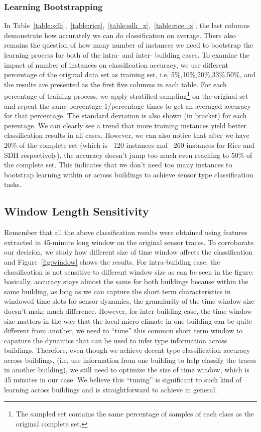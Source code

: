 \subsubsection{Learning Bootstrapping}
In Table~\ref{table:sdh},~\ref{table:rice},~\ref{table:sdh_x},~\ref{table:rice_x}, the last columns demonstrate how accurately we can do classification on average. There also remains the question of how many number of instances we need to bootstrap the learning process for both of the intra- and inter- building cases. To examine the impact of number of instances on classification accuracy, we use different percentage of the original data set as training set, i.e, 5\%,10\%,20\%,33\%,50\%, and the results are presented as the first five columns in each table. For each percentage of training process, we apply stratified sampling\footnote{The sampled set contains the same percentage of samples of each class as the original complete set.} on the original set and repeat the same percentage 1/percentage times to get an averaged accuracy for that percentage. The standard deviation is also shown (in bracket) for each perentage. We can clearly see a trend that more training instances yield better classification results in all cases. However, we can also notice that after we have 20\% of the complete set (which is ~120 instances and ~260 instances for Rice and SDH respectively), the accuracy doesn't jump too much even reaching to 50\% of the complete set. This indicates that we don't need too many instances to bootstrap learning within or across buildings to achieve sensor type classification tasks.


\subsection{Window Length Sensitivity}
Remember that all the above classification results were obtained using features extracted in 45-minute long window on the original sensor traces. To corroborate our decision, we study how different size of time window affects the classification and Figure~\ref{fig:window} shows the results. For intra-building case, the classification is not sensitive to different window size as can be seen in the figure: basically, accuracy stays almost the same for both buildings because within the same building, as long as we can capture the short term characteristics in windowed time slots for sensor dynamics, the granularity of the time window size doesn't make much difference. However, for inter-building case, the time window size matters in the way that the local micro-climate in one building can be quite different from another, we need to ``tune'' this common short term window to capature the dynamics that can be used to infer type information across buildings. Therefore, even though we achieve decent type classification accuracy across buildings, (i.e, use information from one building to help classify the traces in another building), we still need to optimize the size of time window, which is 45 minutes in our case. We believe this ``tuning'' is significant to such kind of learning across buildings and is straightforward to achieve in general.

